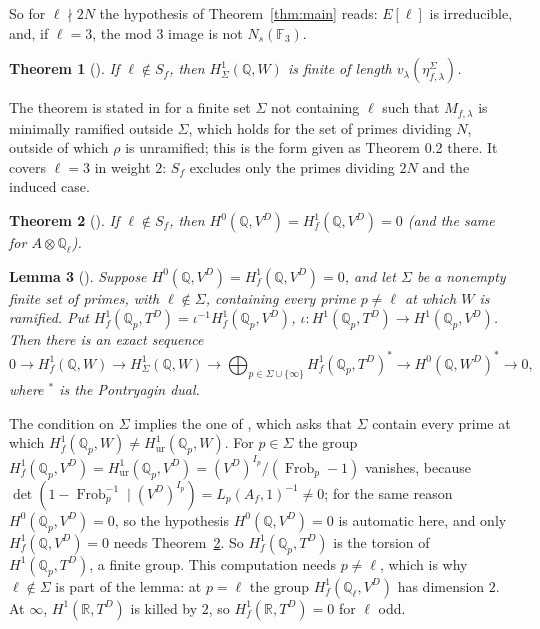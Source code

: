 \documentclass[11pt]{amsart}
\newtheorem{theorem}{Theorem}[section]
\newtheorem{lemma}[theorem]{Lemma}
\theoremstyle{definition}
\newcommand{\Q}{\mathbb{Q}}
\newcommand{\F}{\mathbb{F}}
\newcommand{\R}{\mathbb{R}}
\newcommand{\Frob}{\operatorname{Frob}}
\begin{document}
So for $\ell\nmid2N$ the hypothesis of Theorem~\ref{thm:main} reads: $E[\ell]$ is irreducible, and, if $\ell=3$, the mod $3$ image is not $N_s(\F_3)$.

\begin{theorem}[{\cite[Theorem 3.7]{DFG04}}]\label{thm:dfg37}
If $\ell\notin S_f$, then $H^1_\Sigma(\Q,W)$ is finite of length $v_\lambda(\eta^\Sigma_{f,\lambda})$.
\end{theorem}
The theorem is stated in \cite{DFG04} for a finite set $\Sigma$ not containing $\ell$ such that $M_{f,\lambda}$ is minimally ramified outside $\Sigma$, which holds for the set of primes dividing $N$, outside of which $\rho$ is unramified; this is the form given as Theorem 0.2 there. It covers $\ell=3$ in weight $2$: $S_f$ excludes only the primes dividing $2N$ and the induced case.

\begin{theorem}[{\cite[Theorem 2.7]{DFG04}}]\label{thm:dfg27}
If $\ell\notin S_f$, then $H^0(\Q,V^D)=H^1_f(\Q,V^D)=0$ (and the same for $A\otimes\Q_\ell$).
\end{theorem}

\begin{lemma}[{\cite[Lemma 2.1]{DFG04}}]\label{lem:dfg21}
Suppose $H^0(\Q,V^D)=H^1_f(\Q,V^D)=0$, and let $\Sigma$ be a nonempty finite set of primes, with $\ell\notin\Sigma$, containing every prime $p\ne\ell$ at which $W$ is ramified. Put $H^1_f(\Q_p,T^D)=\iota^{-1}H^1_f(\Q_p,V^D)$, $\iota\colon H^1(\Q_p,T^D)\to H^1(\Q_p,V^D)$. Then there is an exact sequence
\[
0\to H^1_f(\Q,W)\to H^1_\Sigma(\Q,W)\to\bigoplus_{p\in\Sigma\cup\{\infty\}}H^1_f(\Q_p,T^D)^*\to H^0(\Q,W^D)^*\to0,
\]
where $^*$ is the Pontryagin dual.
\end{lemma}
The condition on $\Sigma$ implies the one of \cite{DFG04}, which asks that $\Sigma$ contain every prime at which $H^1_f(\Q_p,W)\ne H^1_{\mathrm{ur}}(\Q_p,W)$. For $p\in\Sigma$ the group $H^1_f(\Q_p,V^D)=H^1_{\mathrm{ur}}(\Q_p,V^D)=(V^D)^{I_p}/(\Frob_p-1)$ vanishes, because $\det(1-\Frob_p^{-1}\mid(V^D)^{I_p})=L_p(A_f,1)^{-1}\ne0$; for the same reason $H^0(\Q_p,V^D)=0$, so the hypothesis $H^0(\Q,V^D)=0$ is automatic here, and only $H^1_f(\Q,V^D)=0$ needs Theorem~\ref{thm:dfg27}. So $H^1_f(\Q_p,T^D)$ is the torsion of $H^1(\Q_p,T^D)$, a finite group. This computation needs $p\ne\ell$, which is why $\ell\notin\Sigma$ is part of the lemma: at $p=\ell$ the group $H^1_f(\Q_\ell,V^D)$ has dimension $2$. At $\infty$, $H^1(\R,T^D)$ is killed by $2$, so $H^1_f(\R,T^D)=0$ for $\ell$ odd.
\end{document}
